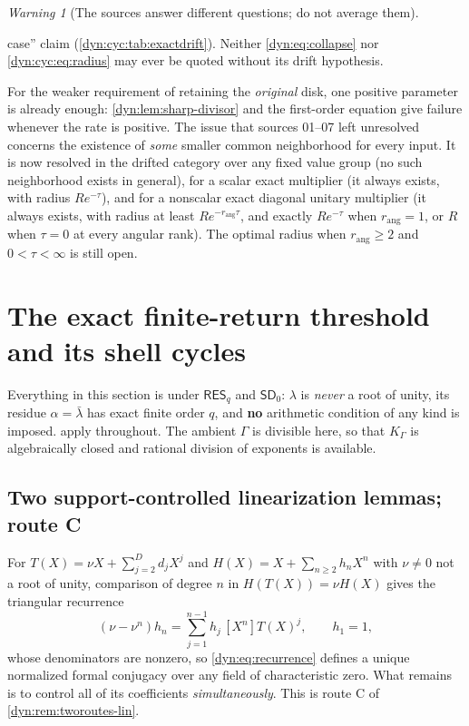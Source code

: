 \documentclass[11pt,letterpaper]{article}
\theoremstyle{definition}
\theoremstyle{remark}
\newtheorem{warning}[warning]{Warning}
\newcommand{\sdz}{\mathsf{SD}_{0}}
\newcommand{\resq}{\mathsf{RES}_q}
\newcommand{\rang}{r_{\mathrm{ang}}}
\numberwithin{equation}{section}
\begin{document}
\begin{warning}[The sources answer different questions; do not average
them]
\begin{itemize}
case'' claim (\cref{dyn:cyc:tab:exactdrift}). Neither
\eqref{dyn:eq:collapse} nor \eqref{dyn:cyc:eq:radius} may ever be quoted
without its drift hypothesis.
\end{itemize}
For the weaker requirement of retaining the \emph{original} disk, one
positive parameter is already enough: \cref{dyn:lem:sharp-divisor} and the
first-order equation give failure whenever the rate is positive. The issue
that sources 01--07 left unresolved concerns the existence of \emph{some}
smaller common neighborhood for every input. It is now resolved in the
drifted category over any fixed value group (no such neighborhood exists in
general), for a scalar exact multiplier (it always exists, with radius
$Re^{-\tau}$), and for a nonscalar exact diagonal unitary multiplier (it
always exists, with radius at least $Re^{-\rang\tau}$, and exactly
$Re^{-\tau}$ when $\rang=1$, or $R$ when $\tau=0$ at every angular rank).
The optimal radius when $\rang\ge2$ and $0<\tau<\infty$ is still open.
\end{warning}

\section{The exact finite-return threshold and its shell cycles}
\label{dyn:sec:return}

Everything in this section is under $\resq$ and $\sdz$: $\lambda$ is
\emph{never} a root of unity, its residue $\alpha=\bar\lambda$ has exact
finite order $q$, and \textbf{no} arithmetic condition of any kind is
imposed.  apply
throughout. The ambient $\Gamma$ is divisible here, so that $K_\Gamma$ is
algebraically closed and rational division of exponents is available.

\subsection{Two support-controlled linearization lemmas; route C}
For $T(X)=\nu X+\sum_{j=2}^{D}d_jX^{j}$ and
$H(X)=X+\sum_{n\ge2}h_nX^{n}$ with $\nu\ne0$ not a root of unity,
comparison of degree $n$ in $H(T(X))=\nu H(X)$ gives the triangular
recurrence
\begin{equation}\label{dyn:eq:recurrence}
 (\nu-\nu^{n})h_n=\sum_{j=1}^{n-1}h_j\,[X^{n}]T(X)^{j},\qquad h_1=1,
\end{equation}
whose denominators are nonzero, so \eqref{dyn:eq:recurrence} defines a
unique normalized formal conjugacy over any field of characteristic zero.
What remains is to control all of its coefficients \emph{simultaneously}.
This is route C of \cref{dyn:rem:tworoutes-lin}.
\end{document}
